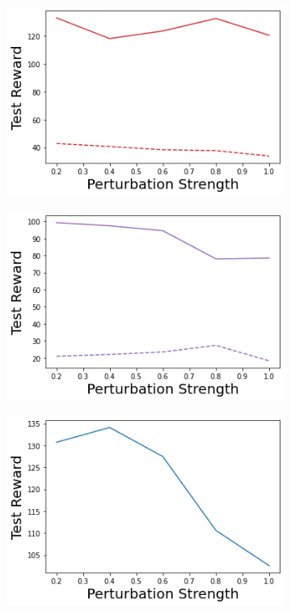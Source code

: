 \begin{figure}
    \begin{subfigure}{.24\textwidth}
        \includegraphics[width=\textwidth]{sections/011_icml2022/resources/transition_shift-DropOut-CartPoleShift-v0-mean_reward_.png}
    \end{subfigure}
    \begin{subfigure}{.24\textwidth}
        \includegraphics[width=\textwidth]{sections/011_icml2022/resources/transition_shift-Ensemble-CartPoleShift-v0-mean_reward_.png}
    \end{subfigure}
    \begin{subfigure}{.24\textwidth}
        \includegraphics[width=\textwidth]{sections/011_icml2022/resources/transition_shift-DKL-CartPoleShift-v0-mean_reward_.png}

\end{subfigure}
\end{figure}
